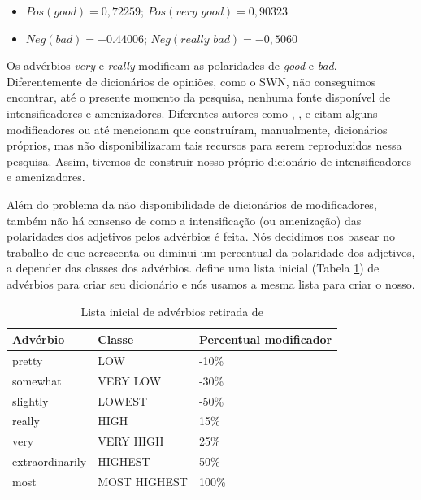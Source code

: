 \begin{itemize}
\item \label{itm:very_exem} $Pos(\textit{good}) = 0,72259$; $Pos(\textit{very good}) = 0,90323$
\item \label{itm:really_exem} $Neg(\textit{bad}) = -0.44006$; $Neg(\textit{really bad}) = -0,5060$
\end{itemize}

Os advérbios \textit{very} e \textit{really} modificam as polaridades de \textit{good} e \textit{bad}. Diferentemente de dicionários de opiniões, como o SWN, não conseguimos encontrar, até o presente momento da pesquisa, nenhuma fonte disponível de intensificadores e amenizadores. Diferentes autores como , ,  e  citam alguns modificadores ou até mencionam que construíram, manualmente, dicionários próprios, mas não disponibilizaram tais recursos para serem reproduzidos nessa pesquisa. Assim, tivemos de construir nosso próprio dicionário de intensificadores e amenizadores. 

Além do problema da não disponibilidade de dicionários de modificadores, também não há consenso de como a intensificação (ou amenização) das polaridades dos adjetivos pelos advérbios é feita. Nós decidimos nos basear no trabalho de  que acrescenta ou diminui um percentual da polaridade dos adjetivos, a depender das classes dos advérbios.  define uma lista inicial (Tabela \ref{table:adv_seed}) de advérbios para criar seu dicionário e nós usamos a mesma lista para criar o nosso.

\begin{table}[!h]
	\centering
    \begin{tabular}{lll}
    Advérbio         				& Classe          & Percentual modificador \\ \hline
    pretty                   			& LOW 			   & -10\% \\
    somewhat                   	& VERY LOW  & -30\% \\
    slightly                   		& LOWEST 	   & -50\% \\
    really                   			& HIGH 			   & 15\% \\
    very                   			& VERY HIGH &  25\% \\
    extraordinarily             & HIGHEST 	   & 50\% \\
    most                   			& MOST HIGHEST & 100\% \\
    \end{tabular}
    \caption{Lista inicial de advérbios retirada de \cite{taboada2011lexicon}}
	\label{table:adv_seed}
\end{table}


